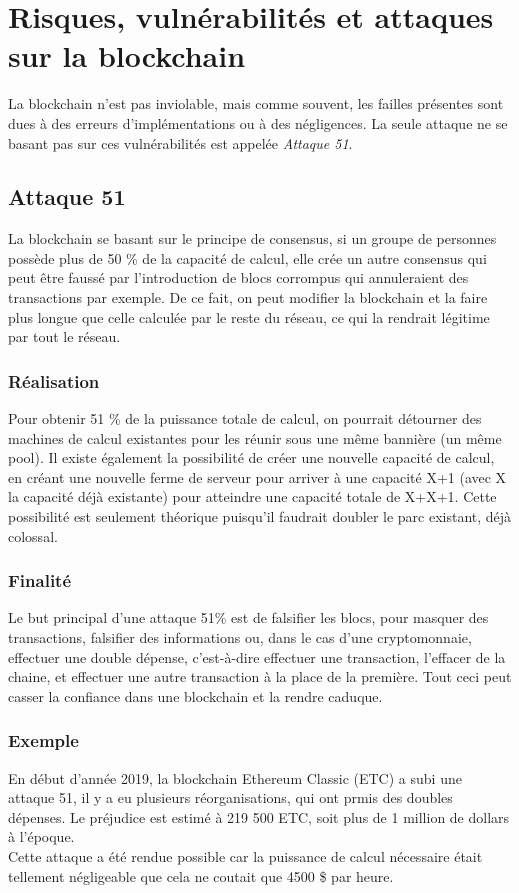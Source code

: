 \documentclass[12pt, a4paper, oneside]{book}
\begin{document}
    \chapter{Risques, vulnérabilités et attaques sur la blockchain}
    La blockchain n'est pas inviolable, mais comme souvent, les failles présentes sont dues à des erreurs d'implémentations ou à des négligences. La seule attaque ne se basant pas sur ces vulnérabilités est appelée \emph{Attaque 51}.
    \section{Attaque 51}
    La blockchain se basant sur le principe de consensus, si un groupe de personnes possède plus de 50 \% de la capacité de calcul, elle crée un autre consensus qui peut être faussé par l'introduction de blocs corrompus qui annuleraient des transactions par exemple. De ce fait, on peut modifier la blockchain et la faire plus longue que celle calculée par le reste du réseau, ce qui la rendrait légitime par tout le réseau.
    \subsection{Réalisation}
    Pour obtenir 51 \% de la puissance totale de calcul, on pourrait détourner des machines de calcul existantes pour les réunir sous une même bannière (un même pool).
    Il existe également la possibilité de créer une nouvelle capacité de calcul, en créant une nouvelle ferme de serveur pour arriver à une capacité X+1 (avec X la capacité déjà existante) pour atteindre une capacité totale de X+X+1. Cette possibilité est seulement théorique puisqu'il faudrait doubler le parc existant, déjà colossal.
    \subsection{Finalité}
    Le but principal d'une attaque 51\% est de falsifier les blocs, pour masquer des transactions, falsifier des informations ou, dans le cas d'une cryptomonnaie, effectuer une double dépense, c'est-à-dire effectuer une transaction, l'effacer de la chaine, et effectuer une autre transaction à la place de la première.
    \newline
    Tout ceci peut casser la confiance dans une blockchain et la rendre caduque.
    \subsection{Exemple}
    En début d'année 2019, la blockchain Ethereum Classic (ETC) a subi une attaque 51, il y a eu plusieurs réorganisations, qui ont prmis des doubles dépenses. Le préjudice est estimé à 219 500 ETC, soit plus de 1 million de dollars à l'époque.
    \\
    Cette attaque a été rendue possible car la puissance de calcul nécessaire était tellement négligeable que cela ne coutait que 4500 \$ par heure.\cite{51ETC}
\end{document}

